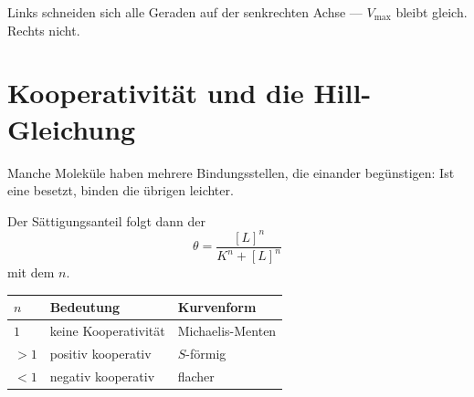 \begin{warnung}
Links schneiden sich alle Geraden auf der senkrechten Achse --- $V_{\max}$ bleibt gleich. Rechts nicht.
\end{warnung}

\section{Kooperativität und die Hill-Gleichung}

\begin{merksatz}
Manche Moleküle haben mehrere Bindungsstellen, die einander begünstigen: Ist eine besetzt, binden die übrigen leichter.

\begin{center}
\begin{minipage}{0.9\textwidth}
Der Sättigungsanteil folgt dann der 
\[ \theta = \frac{[L]^{n}}{K^{n} + [L]^{n}} \]
mit dem  $n$.
\end{minipage}
\end{center}

\begin{center}
{\small
\renewcommand{\arraystretch}{1.48}
\begin{tabular}{@{}P{1.6cm}P{2.8cm}P{3.2cm}@{}}
\toprule
$n$ & \textbf{Bedeutung} & \textbf{Kurvenform}\\
\midrule
$1$ & keine Kooperativität & Michaelis-Menten\\
$>1$ & positiv kooperativ & \textcolor{akzent}{$S$-förmig}\\
$<1$ & negativ kooperativ & flacher\\
\bottomrule
\end{tabular}}
\end{center}

\begin{center}
\begin{minipage}{0.88\textwidth}
\end{minipage}
\end{center}
\end{merksatz}

